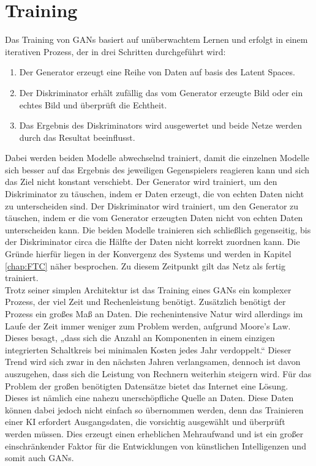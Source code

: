 \section{Training}

\noindent Das Training von \acp{GAN} basiert auf unüberwachtem Lernen und erfolgt in einem iterativen Prozess, der in drei Schritten durchgeführt wird: \\
\begin{enumerate}
    \item Der Generator erzeugt eine Reihe von Daten auf basis des Latent Spaces.
    \item Der Diskriminator erhält zufällig das vom Generator erzeugte Bild oder ein echtes Bild und überprüft die Echtheit.
    \item Das Ergebnis des Diskriminators wird ausgewertet und beide Netze werden durch das Resultat beeinflusst. \\
\end{enumerate}

\noindent Dabei werden beiden Modelle abwechselnd trainiert, damit die einzelnen Modelle sich besser auf das Ergebnis des jeweiligen Gegenspielers reagieren kann und sich das Ziel nicht konstant verschiebt. Der Generator wird trainiert, um den Diskriminator zu täuschen, indem er Daten erzeugt, die von echten Daten nicht zu unterscheiden sind. Der Diskriminator wird trainiert, um den Generator zu täuschen, indem er die vom Generator erzeugten Daten nicht von echten Daten unterscheiden kann. Die beiden Modelle trainieren sich schließlich gegenseitig, bis der Diskriminator circa die Hälfte der Daten nicht korrekt zuordnen kann. Die Gründe hierfür liegen in der Konvergenz des Systems und werden in Kapitel \ref{chap:FTC} näher besprochen. Zu diesem Zeitpunkt gilt das Netz als fertig trainiert\cite{training}. \\

\noindent Trotz seiner simplen Architektur ist das Training eines \acp{GAN} ein komplexer Prozess, der viel Zeit und Rechenleistung benötigt. Zusätzlich benötigt der Prozess ein großes Maß an Daten. Die rechenintensive Natur wird allerdings im Laufe der Zeit immer weniger zum Problem werden, aufgrund Moore's Law. Dieses besagt, „dass sich die Anzahl an Komponenten in einem einzigen integrierten Schaltkreis bei minimalen Kosten jedes Jahr verdoppelt.“\cite{moore} Dieser Trend wird sich zwar in den nächsten Jahren verlangsamen, dennoch ist davon auszugehen, dass sich die Leistung von Rechnern weiterhin steigern wird. Für das Problem der großen benötigten Datensätze bietet das Internet eine Lösung. Dieses ist nämlich eine nahezu unerschöpfliche Quelle an Daten. Diese Daten können dabei jedoch nicht einfach so übernommen werden, denn das Trainieren einer KI erfordert Ausgangsdaten, die vorsichtig ausgewählt und überprüft werden müssen. Dies erzeugt einen erheblichen Mehraufwand und ist ein großer einschränkender Faktor für die Entwicklungen von künstlichen Intelligenzen und somit auch \acp{GAN}.
\newpage